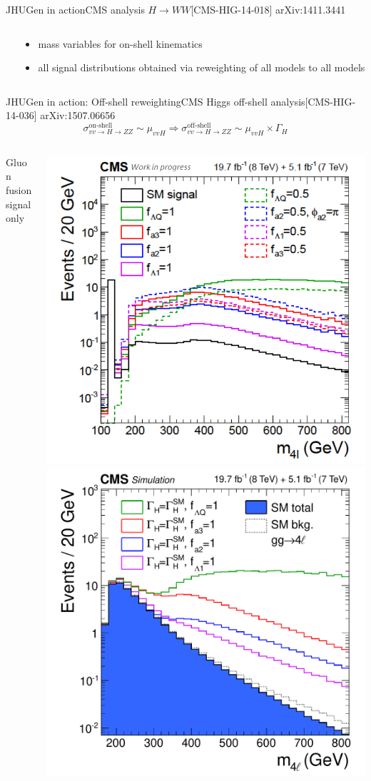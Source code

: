 \documentclass[usenames,dvipsnames,svgnames,table]{beamer}
\renewcommand{\therefore}{\Rightarrow}
\begin{document}
\begin{frame}{JHUGen in action}{CMS analysis $H \to WW$\hfill [CMS-HIG-14-018] arXiv:1411.3441}
\begin{columns}
\begin{column}{0.6\textwidth}
\end{column}
\begin{column}{0.4\textwidth}
\begin{itemize}
\item mass variables for on-shell kinematics
\item all signal distributions obtained via reweighting of all models to all models
\end{itemize}
\end{column}
\end{columns}
\end{frame}

\begin{frame}{JHUGen in action: Off-shell reweighting}{CMS Higgs off-shell analysis\hfill [CMS-HIG-14-036] arXiv:1507.06656}
$$\sigma^\text{on-shell}_{vv\to H\to ZZ}\sim\mu_{vvH}\therefore \sigma^\text{off-shell}_{vv\to H\to ZZ}\sim \mu_{vvH}\times\Gamma_H$$
\begin{columns}
\begin{column}{0.1\textwidth}
Gluon fusion signal only %
\end{column}
\begin{column}{0.75\textwidth}
\includegraphics[width=0.5\columnwidth]{lifetime/signalonly}
\includegraphics[width=0.5\columnwidth]{lifetime/fig1}

\end{column}
\end{columns}
\end{frame}
\end{document}
